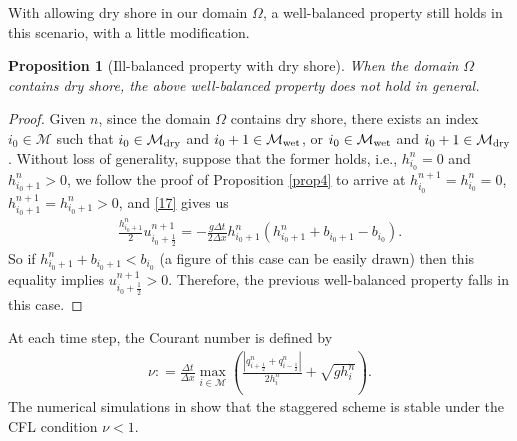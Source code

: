 \documentclass[11pt,a4paper,center,notitlepage]{article}
\numberwithin{equation}{section}
\newtheorem{prop}{Proposition}
\begin{document}
With allowing dry shore in our domain $\Omega$, a well-balanced property still holds in this scenario, with a little modification.

\begin{prop}[Ill-balanced property with dry shore]
When the domain $\Omega$ contains dry shore, the above well-balanced property does not hold in general.
\end{prop}

\begin{proof}
Given $n$, since the domain $\Omega$ contains dry shore, there exists an index $i_0 \in \mathcal{M}$ such that $i_0 \in \mathcal{M}_{\rm dry}$ and $i_0 +1 \in \mathcal{M}_{\rm wet}$, or $i_0 \in \mathcal{M}_{\rm wet}$ and $i_0+1 \in \mathcal{M}_{\rm dry}$. Without loss of generality, suppose that the former holds, i.e., $h_{i_0}^n =0$ and $h_{i_0+1}^n >0$, we follow the proof of Proposition \ref{prop4} to arrive at $h_{{i_0}}^{n + 1} = h_{{i_0}}^n = 0$, $h_{{i_0} + 1}^{n + 1} = h_{{i_0} + 1}^n > 0$, and \eqref{17} gives us
\begin{align*}
\frac{{h_{{i_0} + 1}^n}}{2}u_{{i_0} + \frac{1}{2}}^{n + 1} =  - \frac{{g\Delta t}}{{2\Delta x}}h_{{i_0} + 1}^n\left( {h_{{i_0} + 1}^n + {b_{{i_0} + 1}} - {b_{{i_0}}}} \right).
\end{align*}
So if $h_{{i_0} + 1}^n + {b_{{i_0} + 1}} < {b_{{i_0}}}$ (a figure of this case can be easily drawn) then this equality implies $u_{i_0+\frac{1}{2}}^{n+1} >0$. Therefore, the previous well-balanced property falls in this case.
\end{proof}
At each time step, the Courant number is defined by 
\begin{align*}
\nu : = \frac{{\Delta t}}{{\Delta x}}\mathop {\max }\limits_{i \in \mathcal{M}} \left( {\frac{{\left| {q_{i + \frac{1}{2}}^n + q_{i - \frac{1}{2}}^n} \right|}}{{2h_i^n}} + \sqrt {gh_i^n} } \right).
\end{align*}
The numerical simulations in \cite[pp. 232--234]{Doyen2014} show that the staggered scheme is stable under the CFL condition $\nu <1$.
\end{document}
